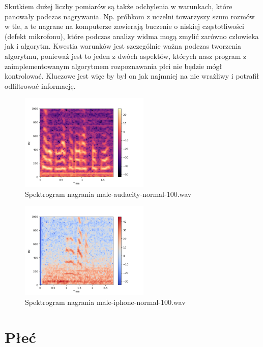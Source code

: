 \documentclass[a4paper,12pt]{extarticle}
\begin{document}
Skutkiem dużej liczby pomiarów są także odchylenia w warunkach, które panowały podczas nagrywania. Np. próbkom z uczelni towarzyszy szum rozmów w tle, a te nagrane na komputerze zawierają buczenie o niskiej częstotliwości (defekt mikrofonu), które podczas analizy widma mogą zmylić zarówno człowieka jak i algorytm. Kwestia warunków jest szczególnie ważna podczas tworzenia algorytmu, ponieważ jest to jeden z dwóch aspektów, których nasz program z zaimplementowanym algorytmem rozpoznawania płci nie będzie mógł kontrolować. Kluczowe jest więc by był on jak najmniej na nie wrażliwy i potrafił odfiltrować informację.

\begin{figure}[ht]
\centering
\includegraphics[width=0.55\textwidth]{3_male-audacity-normal-100.png}
\caption{ Spektrogram nagrania male-audacity-normal-100.wav}
\end{figure}

\begin{figure}[ht]
\centering
\includegraphics[width=0.55\textwidth]{3_male-iphone-normal-100.png}
\caption{ Spektrogram nagrania male-iphone-normal-100.wav}
\end{figure}

\newpage

\section*{Płeć}
\end{document}
